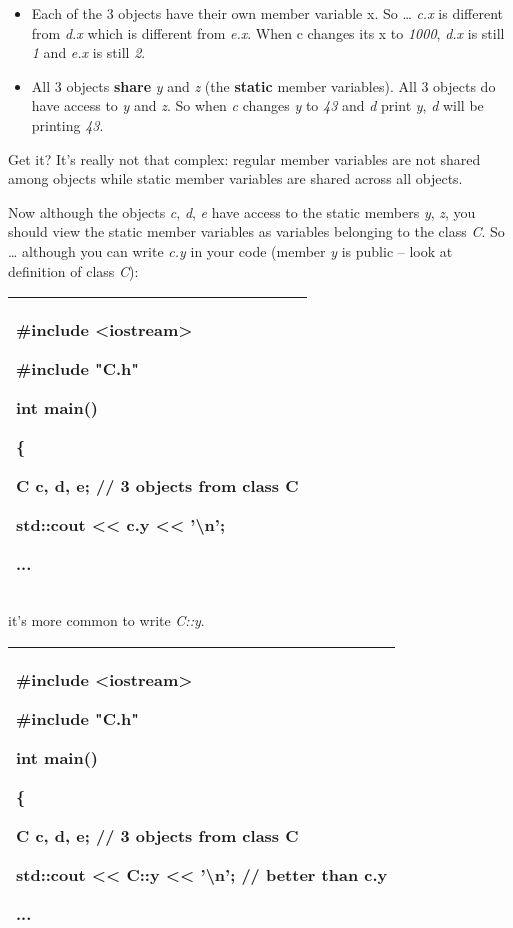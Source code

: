 \documentclass[
]{article}
\providecommand{\tightlist}{%
  \setlength{\itemsep}{0pt}\setlength{\parskip}{0pt}}
\begin{document}
\begin{itemize}
\tightlist
\item
  Each of the 3 objects have their own member variable x. So \ldots{}
  \emph{c.x} is different from \emph{d.x} which is different from
  \emph{e.x}. When c changes its x to \emph{1000}, \emph{d.x} is still
  \emph{1} and \emph{e.x} is still \emph{2}.
\item
  All 3 objects \textbf{share} \emph{y} and \emph{z} (the
  \textbf{static} member variables). All 3 objects do have access to
  \emph{y} and \emph{z}. So when \emph{c} changes \emph{y} to \emph{43}
  and \emph{d} print \emph{y}, \emph{d} will be printing \emph{43}.
\end{itemize}

Get it? It's really not that complex: regular member variables are not
shared among objects while static member variables are shared across all
objects.

Now although the objects \emph{c}, \emph{d}, \emph{e} have access to the
static members \emph{y}, \emph{z}, you should view the static member
variables as variables belonging to the class \emph{C}. So \ldots{}
although you can write \emph{c.y} in your code (member \emph{y} is
public -- look at definition of class \emph{C}):

\begin{longtable}[]{@{}l@{}}
\toprule
\endhead
\begin{minipage}[t]{0.97\columnwidth}\raggedright
\#include \textless iostream\textgreater{}

\#include "C.h"

int main()

\{

C c, d, e; // 3 objects from class C

std::cout \textless\textless{} c.y \textless\textless{}
'\textbackslash n';

...\strut
\end{minipage}\tabularnewline
\bottomrule
\end{longtable}

it's more common to write \emph{C::y}.

\begin{longtable}[]{@{}l@{}}
\toprule
\endhead
\begin{minipage}[t]{0.97\columnwidth}\raggedright
\#include \textless iostream\textgreater{}

\#include "C.h"

int main()

\{

C c, d, e; // 3 objects from class C

std::cout \textless\textless{} \textbf{C::y} \textless\textless{}
'\textbackslash n'; // better than c.y

...\strut
\end{minipage}\tabularnewline
\bottomrule
\end{longtable}
\end{document}
